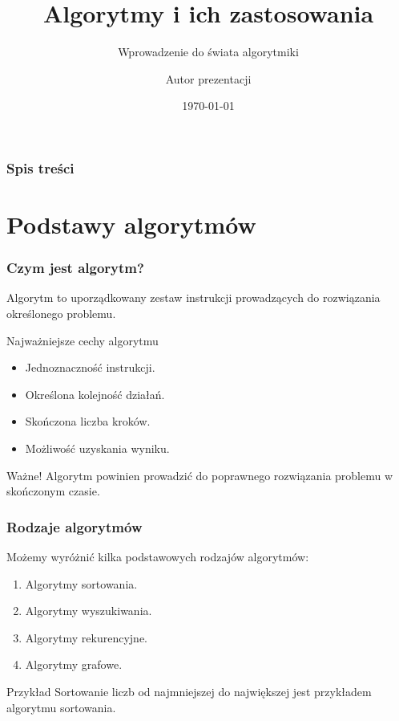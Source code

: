 \documentclass[ aspectratio=169 ]{beamer}
\title{Algorytmy i ich zastosowania}
\subtitle{Wprowadzenie do świata algorytmiki}
\author{Autor prezentacji}
\institute{Projekt Prezentacja}
\date{\today}
\begin{document}
\begin{frame}
    \titlepage
\end{frame}

\begin{frame}
    \frametitle{Spis treści}
    \tableofcontents
\end{frame}

\section{Podstawy algorytmów}

\begin{frame}
    \frametitle{Czym jest algorytm?}

    Algorytm to uporządkowany zestaw instrukcji prowadzących
    do rozwiązania określonego problemu.

    \begin{block}{Najważniejsze cechy algorytmu}
        \begin{itemize}
            \item Jednoznaczność instrukcji.
            \item Określona kolejność działań.
            \item Skończona liczba kroków.
            \item Możliwość uzyskania wyniku.
        \end{itemize}
    \end{block}

    \begin{alertblock}{Ważne!}
        Algorytm powinien prowadzić do poprawnego rozwiązania
        problemu w skończonym czasie.
    \end{alertblock}
\end{frame}

\begin{frame}
    \frametitle{Rodzaje algorytmów}

    Możemy wyróżnić kilka podstawowych rodzajów algorytmów:

    \begin{enumerate}
        \item Algorytmy sortowania.
        \item Algorytmy wyszukiwania.
        \item Algorytmy rekurencyjne.
        \item Algorytmy grafowe.
    \end{enumerate}

    \begin{exampleblock}{Przykład}
        Sortowanie liczb od najmniejszej do największej
        jest przykładem algorytmu sortowania.
    \end{exampleblock}
\end{frame}
\end{document}
